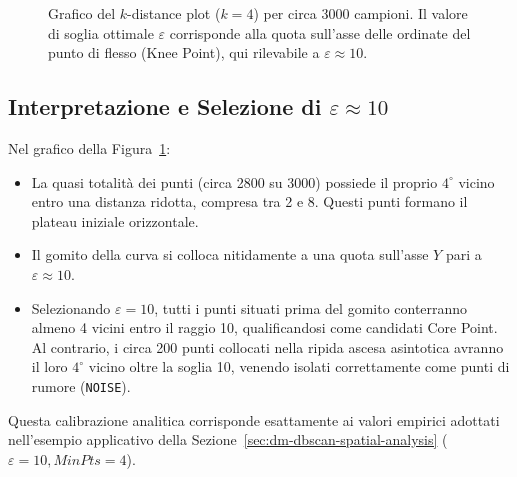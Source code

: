 \begin{figure}[H]
\caption{Grafico del $k$-distance plot ($k = 4$) per circa 3000 campioni. Il valore di soglia ottimale $\varepsilon$ corrisponde alla quota sull'asse delle ordinate del punto di flesso (Knee Point), qui rilevabile a $\varepsilon \approx 10$.}
\label{fig:dm-dbscan-k-distance-plot}
\end{figure}

\FloatBarrier
\subsection{Interpretazione e Selezione di \texorpdfstring{$\varepsilon \approx 10$}{Eps circa 10}}

Nel grafico della Figura~\ref{fig:dm-dbscan-k-distance-plot}:
\begin{itemize}
    \item La quasi totalità dei punti (circa 2800 su 3000) possiede il proprio $4^\circ$ vicino entro una distanza ridotta, compresa tra 2 e 8. Questi punti formano il plateau iniziale orizzontale.
    \item Il gomito della curva si colloca nitidamente a una quota sull'asse $Y$ pari a $\varepsilon \approx 10$.
    \item Selezionando $\varepsilon = 10$, tutti i punti situati prima del gomito conterranno almeno 4 vicini entro il raggio 10, qualificandosi come candidati Core Point. Al contrario, i circa 200 punti collocati nella ripida ascesa asintotica avranno il loro $4^\circ$ vicino oltre la soglia 10, venendo isolati correttamente come punti di rumore (\texttt{NOISE}).
\end{itemize}
Questa calibrazione analitica corrisponde esattamente ai valori empirici adottati nell'esempio applicativo della Sezione~\ref{sec:dm-dbscan-spatial-analysis} ($\varepsilon = 10, MinPts = 4$).

